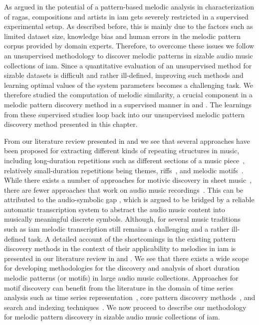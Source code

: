 As argued in  the potential of a pattern-based melodic analysis in characterization of \glspl{raga}, compositions and artists in \gls{iam} gets severely restricted in a supervised experimental setup. As described before, this is mainly due to the factors such as limited dataset size, knowledge bias and human errors in the melodic pattern corpus provided by domain experts. Therefore, to overcome these issues we follow an unsupervised methodology to discover melodic patterns in sizable audio music collections of \gls{iam}. Since a quantitative evaluation of an unsupervised method for sizable datasets is difficult and rather ill-defined, improving such methods and learning optimal values of the system parameters becomes a challenging task. We therefore studied the computation of melodic similarity, a crucial component in a melodic pattern discovery method in a supervised manner in  and . The learnings from these supervised studies loop back into our unsupervised melodic pattern discovery method presented in this chapter. 

From our literature review presented in  and  we see that several approaches have been proposed for extracting different kinds of repeating structures in music, including long-duration repetitions such as different sections of a music piece~\citep{serra2012unsupervised,Goto06TASLP, paulus2010state}, relatively small-duration repetitions being themes, riffs~\citep{Hsu2001a}, and melodic motifs~\citep{meredith2002algorithms,collins2011improved,Janssen2013}. While there exists a number of approaches for motivic discovery in sheet music~\citep{meredith2002algorithms,Cambouropoulos2006,conklin2001representation,Lartillot2005}, there are fewer approaches that work on audio music recordings~\citep{dannenberg2003pattern}. This can be attributed to the audio-symbolic gap \citep{collins2014bridging}, which is argued to be bridged by a reliable automatic transcription system to abstract the audio music content into musically meaningful discrete symbols. Although, for several music traditions such as \gls{iam} melodic transcription still remains a challenging and a rather ill-defined task. A detailed account of the shortcomings in the existing pattern discovery methods in the context of their applicability to melodies in \gls{iam} is presented in our literature review in  and . We see that there exists a wide scope for developing methodologies for the discovery and analysis of short duration melodic patterns (or motifs) in large audio music collections. Approaches for motif discovery can benefit from the literature in the domain of time series analysis such as time series representation~\citep{Lin2003}, core pattern discovery methods~\citep{Mueen2009}, and search and indexing techniques~\citep{Rakthanmanon2013}. We now proceed to describe our methodology for melodic pattern discovery in sizable audio music collections of \gls{iam}.


